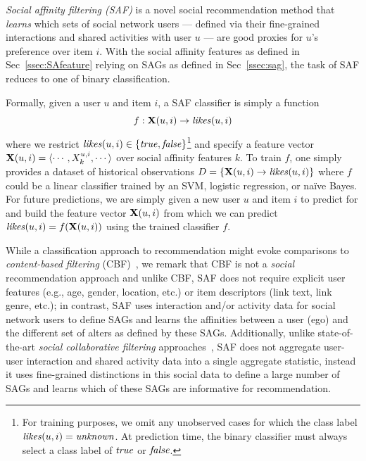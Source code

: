 \emph{Social affinity filtering (SAF)} is a novel social
recommendation method that \emph{learns} which sets of social network
users --- defined via their fine-grained interactions and shared
activities with user $u$ --- are good proxies for $u$'s preference
over item $i$.  With the social affinity features as defined in
Sec~\ref{ssec:SAfeature} relying on SAGs as defined in
Sec~\ref{ssec:sag}, the task of SAF reduces to one of binary
classification.

Formally, given a user $u$ and item $i$, a SAF classifier is simply a
function 
\begin{equation*}
f: \x(u,i) \to \likes(u,i)
\end{equation*}
where we restrict $\likes(u,i) \in \{ \true, \false \}$\footnote{For
  training purposes, we omit any unobserved cases for which the class
  label $\likes(u,i)=\unknown$.  At prediction time, the binary
  classifier must always select a class label of $\true$ or $\false$.}
and specify a feature vector $\x(u,i) = \langle
\cdots,X^{u,i}_{k},\cdots \rangle$ over social affinity features
$k$.  To train $f$, one simply provides a dataset of historical
observations $D = \{ \x(u,i) \to \likes(u,i) \}$ where $f$ could be a
linear classifier trained by an SVM, logistic regression, or na\"{i}ve
Bayes.  For future predictions, we are simply given a new user $u$ and
item $i$ to predict for and build the feature vector $\x(u,i)$ from
which we can predict $\likes(u,i) = f(\x(u,i))$ using the trained
classifier $f$.

While a classification approach to recommendation might evoke
comparisons to \emph{content-based filtering} (CBF)~\cite{newsweeder},
we remark that CBF is not a \emph{social} recommendation approach and
unlike CBF, SAF does not require explicit user features (e.g., age,
gender, location, etc.) or item descriptors (link text, link genre,
etc.); in contrast, SAF uses interaction and/or activity data for
social network users to define SAGs and learns the affinities between
a user (ego) and the different set of alters as defined by these SAGs.
Additionally, unlike state-of-the-art \emph{social collaborative filtering} 
approaches~\cite{socinf,rrmf,ste,sorec,sr,Noel2012NOF,lla}, SAF does
not aggregate user-user interaction and shared activity data into a
single aggregate statistic, instead it uses fine-grained distinctions
in this social data to define a large number of SAGs and learns which
of these SAGs are informative for recommendation.


